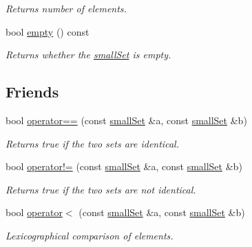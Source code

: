 \begin{CompactItemize}
\begin{CompactList}\small\item\em Returns number of elements. \item\end{CompactList}\item 
\hypertarget{classdai_1_1smallSet_b405901de2feb12ff027b973a234a39c}{
bool \hyperlink{classdai_1_1smallSet_b405901de2feb12ff027b973a234a39c}{empty} () const }
\label{classdai_1_1smallSet_b405901de2feb12ff027b973a234a39c}

\begin{CompactList}\small\item\em Returns whether the \hyperlink{classdai_1_1smallSet}{smallSet} is empty. \item\end{CompactList}\end{CompactItemize}
\subsection*{Friends}
\begin{CompactItemize}
\item 
\hypertarget{classdai_1_1smallSet_60606e0d17f55f318f329d556f0c9f80}{
bool \hyperlink{classdai_1_1smallSet_60606e0d17f55f318f329d556f0c9f80}{operator==} (const \hyperlink{classdai_1_1smallSet}{smallSet} \&a, const \hyperlink{classdai_1_1smallSet}{smallSet} \&b)}
\label{classdai_1_1smallSet_60606e0d17f55f318f329d556f0c9f80}

\begin{CompactList}\small\item\em Returns true if the two sets are identical. \item\end{CompactList}\item 
\hypertarget{classdai_1_1smallSet_49e074002843253d59bbe70241e79d84}{
bool \hyperlink{classdai_1_1smallSet_49e074002843253d59bbe70241e79d84}{operator!=} (const \hyperlink{classdai_1_1smallSet}{smallSet} \&a, const \hyperlink{classdai_1_1smallSet}{smallSet} \&b)}
\label{classdai_1_1smallSet_49e074002843253d59bbe70241e79d84}

\begin{CompactList}\small\item\em Returns true if the two sets are not identical. \item\end{CompactList}\item 
\hypertarget{classdai_1_1smallSet_44abfb513a428e283045812964dc64e5}{
bool \hyperlink{classdai_1_1smallSet_44abfb513a428e283045812964dc64e5}{operator$<$} (const \hyperlink{classdai_1_1smallSet}{smallSet} \&a, const \hyperlink{classdai_1_1smallSet}{smallSet} \&b)}
\label{classdai_1_1smallSet_44abfb513a428e283045812964dc64e5}

\begin{CompactList}\small\item\em Lexicographical comparison of elements. \item\end{CompactList}\end{CompactItemize}


